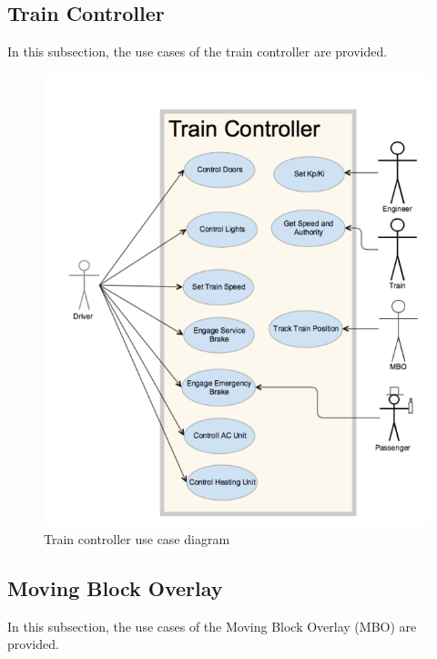 \documentclass[]{article}
\begin{document}
\subsection{Train Controller}
In this subsection, the use cases of the train controller are provided.

\begin{figure}[H]
	\centering
	\includegraphics[scale=.2]{traincontrollerusecase.png}
	\caption{Train controller use case diagram}
\end{figure}

\subsection{Moving Block Overlay}
In this subsection, the use cases of the Moving Block Overlay (MBO) are provided.
\end{document}
